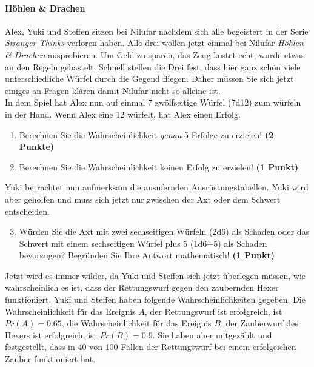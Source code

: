 \documentclass[a4paper, 9pt]{scrartcl}\usepackage[]{graphicx}\usepackage[]{xcolor}
\begin{document}
\paragraph{Höhlen \& Drachen}



Alex, Yuki und Steffen sitzen bei Nilufar nachdem sich alle begeistert in der Serie \textit{Stranger Thinks} verloren haben. Alle drei wollen jetzt einmal bei Nilufar \textit{Höhlen \& Drachen} ausprobieren. Um Geld zu sparen, das Zeug kostet echt, wurde etwas an den Regeln gebastelt. Schnell stellen die Drei fest, dass hier ganz schön viele unterschiedliche Würfel durch die Gegend fliegen. Daher müssen Sie sich jetzt einiges an Fragen klären damit Nilufar nicht so alleine ist. \\%

In dem Spiel hat Alex nun auf einmal 7 zwölfseitige Würfel (7d12) zum würfeln in der Hand. Wenn Alex eine 12 würfelt, hat Alex einen Erfolg.

\begin{enumerate}
\item Berechnen Sie die Wahrscheinlichkeit \textit{genau} 5 Erfolge zu erzielen!  \textbf{(2 Punkte)}
\item Berechnen Sie die Wahrscheinlichkeit keinen Erfolg zu erzielen! \textbf{(1 Punkt)}
\end{enumerate}

Yuki betrachtet nun aufmerksam die ausufernden Ausrüstungstabellen. Yuki wird aber geholfen und muss sich jetzt nur zwischen der Axt oder dem Schwert entscheiden.

\begin{enumerate}
  \setcounter{enumi}{2}
\item Würden Sie die Axt mit zwei sechseitigen Würfeln (2d6) als Schaden oder das Schwert mit einem sechseitigen Würfel plus 5 (1d6+5) als Schaden bevorzugen? Begründen Sie Ihre Antwort mathematisch! \textbf{(1 Punkt)}
\end{enumerate}

Jetzt wird es immer wilder, da Yuki und Steffen sich jetzt überlegen müssen, wie wahrscheinlich es ist, dass der Rettungswurf gegen den zaubernden Hexer funktioniert. Yuki und Steffen haben folgende Wahrscheinlichkeiten gegeben. Die Wahrscheinlichkeit für das Ereignis $A$, der Rettungswurf ist erfolgreich, ist $Pr(A) = 0.65$, die Wahrscheinlichkeit für das Ereignis $B$, der Zauberwurf des Hexers ist erfolgreich, ist $Pr(B) = 0.9$. Sie haben aber mitgezählt und festgestellt, dass in $40$ von 100 Fällen der Rettungswurf bei einem erfolgeichen Zauber funktioniert hat.  
\end{document}
